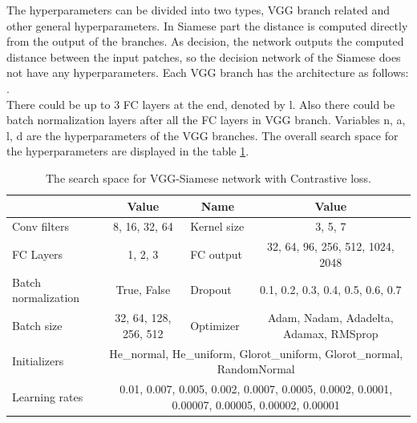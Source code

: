 The hyperparameters can be divided into two types, VGG branch related and other general hyperparameters. In Siamese part the distance is computed directly from the output of the branches. As decision, the network outputs the computed distance
between the input patches, so the decision network of the Siamese does not have any hyperparameters.
Each VGG branch has the architecture as follows: \\ . \\There could be up to 3 FC layers at the end, denoted by l.
Also there could be batch normalization layers after all the FC layers in VGG branch. %
Variables n, a, l, d are the hyperparameters of the VGG branches. The overall search space for the hyperparameters are displayed in the table \ref{table:Search_space_contrastive}.

\begin{table}[ht]
\centering
\caption{The search space for VGG-Siamese network with Contrastive loss.}
\resizebox{\textwidth}{!}
{\begin{tabular}{|l c| l c|} 
 \hline\hline
 \rowcolor{lightgrey}
 \multicolumn{1}{|c}{\textbf{Name}} & \multicolumn{1}{c|}{\textbf{Value}} & \multicolumn{1}{c}{\textbf{Name}} & \multicolumn{1}{c|}{\textbf{Value}} \\ [0.5ex] 
 \hline
 Conv filters & 8, 16, 32, 64 & Kernel size & 3, 5, 7\\
 \hline
 FC Layers & 1, 2, 3 &  FC output & 32, 64, 96, 256, 512, 1024, 2048 \\ 
 \hline
 Batch normalization & True, False & Dropout & 0.1, 0.2, 0.3, 0.4, 0.5, 0.6, 0.7 \\
 \hline
 Batch size & 32, 64, 128, 256, 512 & Optimizer & Adam, Nadam, Adadelta, Adamax, RMSprop\\
 \hline
 Initializers & \multicolumn{3}{c|}{ He\_normal, He\_uniform, Glorot\_uniform, Glorot\_normal, RandomNormal} \\
 \hline
 Learning rates & \multicolumn{3}{c|}{0.01, 0.007, 0.005, 0.002, 0.0007, 0.0005, 0.0002, 0.0001, 0.00007, 0.00005, 0.00002, 0.00001}\\
 \hline \hline
\end{tabular}}
\label{table:Search_space_contrastive}
\end{table}

